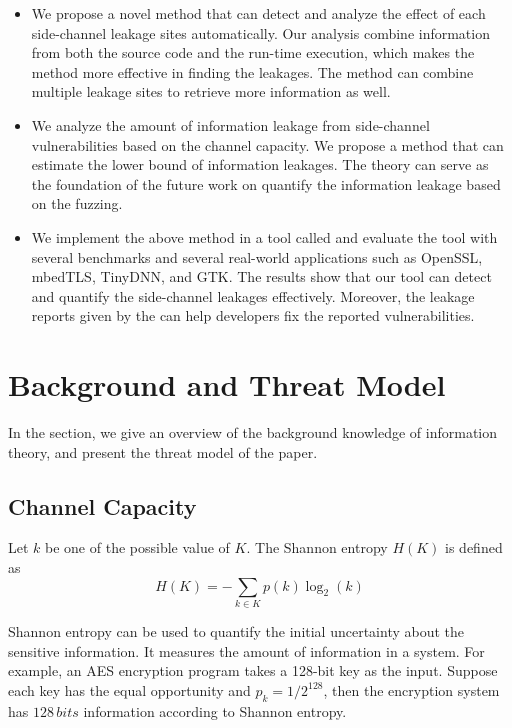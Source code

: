 \begin{itemize}

  \item We propose a novel method that can detect and analyze the effect of each side-channel leakage sites automatically. Our analysis combine information from both the source code and the run-time execution, which makes the method more effective in finding the leakages. The method can combine multiple leakage sites to retrieve more information as well.

  \item We analyze the amount of information leakage from side-channel vulnerabilities based on the channel capacity. We propose a method that can estimate the lower bound of information leakages. The theory can serve as the foundation of the future work on quantify the information leakage based on the fuzzing.

  \item We implement the above method in a tool called \ctool{} and evaluate the tool with several benchmarks and several real-world applications such as OpenSSL, mbedTLS, TinyDNN, and GTK. The results show that our tool can detect and quantify the side-channel leakages effectively. Moreover, the leakage reports given by the \ctool{} can help developers fix the reported vulnerabilities.
\end{itemize}

\section{Background and Threat Model}
In the section, we give an overview of the background knowledge of information theory, and present the threat model of the paper.


\subsection{Channel Capacity}
Let $k$ be one of the possible
value of $K$. The Shannon entropy $H(K)$ is defined as
\begin{equation}\label{chapter5:eq1}
  H(K) = - \sum_{k {\in} K}p(k)\log_2(k)
\end{equation}

Shannon entropy can be used to quantify the initial uncertainty about the sensitive information. It measures the amount of information in a system. For example, an AES encryption program takes a 128-bit key as the input. Suppose each key has the equal opportunity and $p_k = 1/ 2^{128}$, then the encryption system has $128 \, \mathit{bits}$ information according to Shannon entropy.


